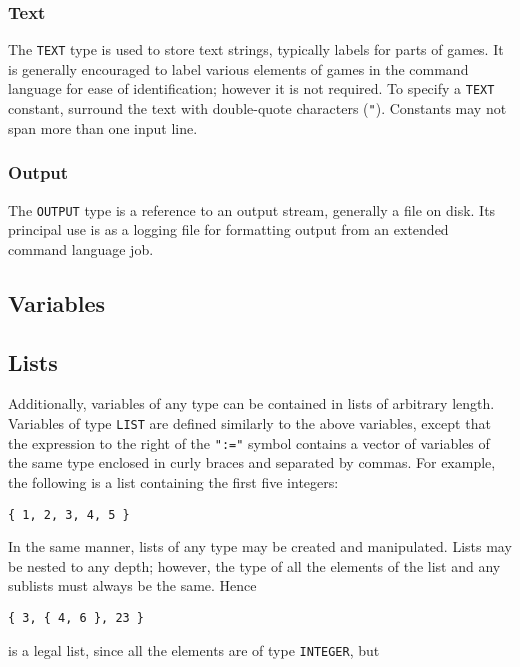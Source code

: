 \subsubsection{Text}

The {\tt TEXT} type is used to store text strings, typically labels
for parts of games.  It is generally encouraged to label various elements
of games in the command language for ease of identification; however it
is not required.  To specify a {\tt TEXT} constant, surround the
text with double-quote characters ({\tt "}).  Constants may not span
more than one input line.

\subsubsection{Output}

The {\tt OUTPUT} type is a reference to an output stream, generally a file
on disk.  Its principal use is as a logging file for formatting output
from an extended command language job.

\subsection{Variables}

\subsection{Lists}

Additionally, variables of any type can be contained in lists of arbitrary
length.
Variables of type {\tt LIST} are defined similarly to the above variables,
except that the expression to the right of the {\tt ":="} symbol
contains a vector of variables of the same type enclosed in curly braces
and separated by commas.  For example, the following is a list containing
the first five integers:

\begin{verbatim}
{ 1, 2, 3, 4, 5 }
\end{verbatim}

\noindent In the same manner, lists of any type may be created and manipulated.
Lists may be nested to any depth; however, the type of all the elements
of the list and any sublists must always be the same.  Hence

\begin{verbatim}
{ 3, { 4, 6 }, 23 }
\end{verbatim}

\noindent is a legal list, since all the elements are of type 
{\tt INTEGER}, but

